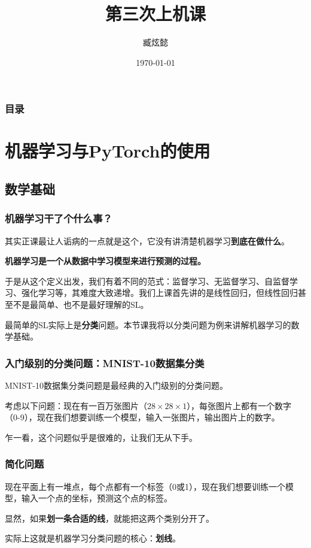 \documentclass{ctexbeamer}
\title{第三次上机课}
\author{臧炫懿}
\date{\today}
\begin{document}
\frame{\titlepage}

\begin{frame}
    \frametitle{目录}

    \tableofcontents

\end{frame}

\section{机器学习与PyTorch的使用}

\frame{\sectionpage}

\subsection{数学基础}

\begin{frame}
    \frametitle{机器学习干了个什么事？}

    其实正课最让人诟病的一点就是这个，它没有讲清楚机器学习\textbf{到底在做什么}。

    \hspace{1em}
    \begin{center}
        \Large \textbf{机器学习是一个从数据中学习模型来进行预测的过程。}
    \end{center}

    于是从这个定义出发，我们有着不同的范式：监督学习、无监督学习、自监督学习、强化学习等，其难度大致递增。我们上课首先讲的是线性回归，但线性回归甚至不是最简单、也不是最好理解的SL。

    最简单的SL实际上是\textbf{分类}问题。本节课我将以分类问题为例来讲解机器学习的数学基础。

\end{frame}

\begin{frame}
    \frametitle{入门级别的分类问题：MNIST-10数据集分类}

    MNIST-10数据集分类问题是最经典的入门级别的分类问题。

    考虑以下问题：现在有一百万张图片（$28\times 28 \times 1$），每张图片上都有一个数字（0-9），现在我们想要训练一个模型，输入一张图片，输出图片上的数字。

    乍一看，这个问题似乎是很难的，让我们无从下手。

\end{frame}

\begin{frame}
    \frametitle{简化问题}

    现在平面上有一堆点，每个点都有一个标签（0或1），现在我们想要训练一个模型，输入一个点的坐标，预测这个点的标签。

    \hspace{2em}
    \pause

    显然，如果\textbf{划一条合适的线}，就能把这两个类别分开了。

    实际上这就是机器学习分类问题的核心：\textbf{划线}。

\end{frame}
\end{document}
